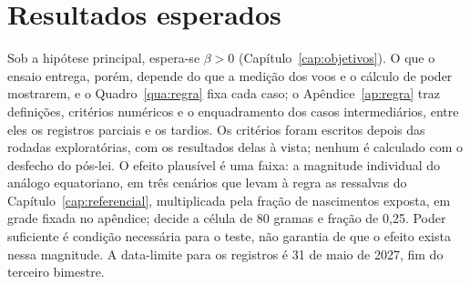 
\chapter{Resultados esperados}
\label{cap:resultados}

\label{sec:regra}Sob a hipótese principal, espera-se $\beta > 0$
(Capítulo~\ref{cap:objetivos}). O que o ensaio entrega, porém, depende do que
a medição dos voos e o cálculo de poder mostrarem, e o Quadro~\ref{qua:regra}
fixa cada caso; o Apêndice~\ref{ap:regra} traz definições, critérios numéricos
e o enquadramento dos casos intermediários, entre eles os registros parciais
e os tardios. Os critérios foram escritos depois das rodadas exploratórias,
com os resultados delas à vista; nenhum é calculado com o desfecho do pós-lei. O efeito plausível é uma faixa: a
magnitude individual do análogo equatoriano, em três cenários que levam à
regra as ressalvas do Capítulo~\ref{cap:referencial}, multiplicada pela fração
de nascimentos exposta, em grade fixada no apêndice; decide a célula de 80
gramas e fração de 0,25.
Poder suficiente é condição necessária para o teste, não garantia de que o
efeito exista nessa magnitude. A data-limite para os registros é 31 de maio de
2027, fim do terceiro bimestre.

